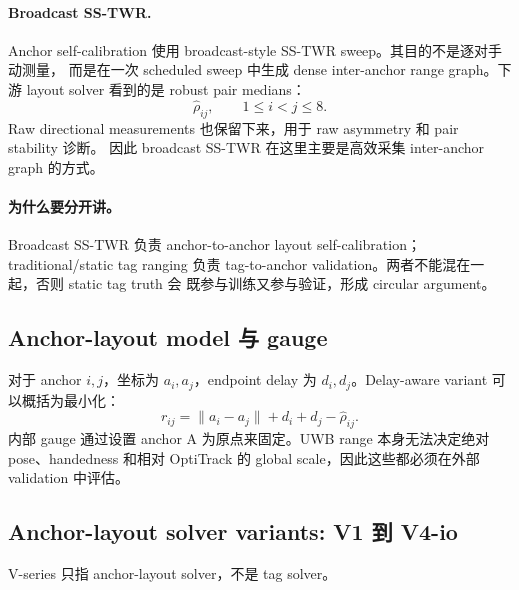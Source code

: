 \documentclass[11pt,a4paper]{article}
\begin{document}
\paragraph{Broadcast SS-TWR.}
Anchor self-calibration 使用 broadcast-style SS-TWR sweep。其目的不是逐对手动测量，
而是在一次 scheduled sweep 中生成 dense inter-anchor range graph。下游 layout solver
看到的是 robust pair medians：
\[
  \hat{\rho}_{ij}, \qquad 1\le i < j \le 8.
\]
Raw directional measurements 也保留下来，用于 raw asymmetry 和 pair stability 诊断。
因此 broadcast SS-TWR 在这里主要是高效采集 inter-anchor graph 的方式。

\paragraph{为什么要分开讲。}
Broadcast SS-TWR 负责 anchor-to-anchor layout self-calibration；traditional/static
tag ranging 负责 tag-to-anchor validation。两者不能混在一起，否则 static tag truth 会
既参与训练又参与验证，形成 circular argument。

\subsection{Anchor-layout model 与 gauge}
对于 anchor $i,j$，坐标为 $a_i,a_j$，endpoint delay 为 $d_i,d_j$。Delay-aware variant
可以概括为最小化：
\[
  r_{ij} = \lVert a_i-a_j\rVert + d_i + d_j - \hat{\rho}_{ij}.
\]
内部 gauge 通过设置 anchor A 为原点来固定。UWB range 本身无法决定绝对 pose、handedness
和相对 OptiTrack 的 global scale，因此这些都必须在外部 validation 中评估。

\subsection{Anchor-layout solver variants: V1 到 V4-io}
\label{sec:vmethod}
V-series 只指 anchor-layout solver，不是 tag solver。
\end{document}
